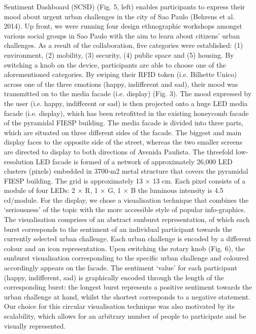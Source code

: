 Sentiment Dashboard (SCSD) (Fig. 5, left) enables participants to express their
mood about urgent urban challenges in the city of Sao Paulo (Behrens et al. 2014).
Up front, we were running four design ethnographic workshops amongst
various social groups in Sao Paulo with the aim to learn about citizens’ urban
challenges. As a result of the collaboration, five categories were established:
(1) environment, (2) mobility, (3) security, (4) public space and (5) housing.
By switching a knob on the device, participants are able to choose one of the
aforementioned categories. By swiping their RFID token (i.e. Bilhette Unico)
across one of the three emotions (happy, indifferent and sad), their mood was
transmitted on to the media facade (i.e. display) (Fig. 3).
The mood expressed by the user (i.e. happy, indifferent or sad) is then projected
onto a huge LED media facade (i.e. display), which has been retrofitted in the
existing honeycomb facade of the pyramidal FIESP building.
The media facade is divided into three parts, which are situated on three different
sides of the facade. The biggest and main display faces to the opposite side of
the street, whereas the two smaller screens are directed to display to both directions
of Avenida Paulista. The threefold low-resolution LED facade is formed of
a network of approximately 26,000 LED clusters (pixels) embedded in 3700-m2
metal structure that covers the pyramidal FIESP building. The grid is approximately
13 × 13 cm. Each pixel consists of a module of four LEDs: 2 × R, 1 × G,
1 × B the luminous intensity is 4.5 cd/module.
For the display, we chose a visualisation technique that combines the ‘seriousness’
of the topic with the more accessible style of popular info-graphics. The visualisation
comprises of an abstract sunburst representation, of which each burst
corresponds to the sentiment of an individual participant towards the currently
selected urban challenge. Each urban challenge is encoded by a different colour
and an icon representation. Upon switching the rotary knob (Fig. 6), the sunburst
visualisation corresponding to the specific urban challenge and coloured accordingly
appears on the facade. The sentiment ‘value’ for each participant (happy,
indifferent, sad) is graphically encoded through the length of the corresponding
burst: the longest burst represents a positive sentiment towards the urban challenge
at hand, whilst the shortest corresponds to a negative statement. Our choice for
this circular visualisation technique was also motivated by its scalability, which
allows for an arbitrary number of people to participate and be visually represented.
